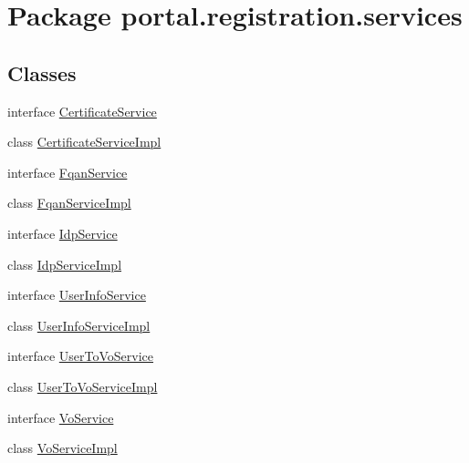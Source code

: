 \hypertarget{namespaceportal_1_1registration_1_1services}{
\section{Package portal.registration.services}
\label{namespaceportal_1_1registration_1_1services}
}
\subsection*{Classes}
\begin{DoxyCompactItemize}
\item 
interface \hyperlink{interfaceportal_1_1registration_1_1services_1_1CertificateService}{CertificateService}
\item 
class \hyperlink{classportal_1_1registration_1_1services_1_1CertificateServiceImpl}{CertificateServiceImpl}
\item 
interface \hyperlink{interfaceportal_1_1registration_1_1services_1_1FqanService}{FqanService}
\item 
class \hyperlink{classportal_1_1registration_1_1services_1_1FqanServiceImpl}{FqanServiceImpl}
\item 
interface \hyperlink{interfaceportal_1_1registration_1_1services_1_1IdpService}{IdpService}
\item 
class \hyperlink{classportal_1_1registration_1_1services_1_1IdpServiceImpl}{IdpServiceImpl}
\item 
interface \hyperlink{interfaceportal_1_1registration_1_1services_1_1UserInfoService}{UserInfoService}
\item 
class \hyperlink{classportal_1_1registration_1_1services_1_1UserInfoServiceImpl}{UserInfoServiceImpl}
\item 
interface \hyperlink{interfaceportal_1_1registration_1_1services_1_1UserToVoService}{UserToVoService}
\item 
class \hyperlink{classportal_1_1registration_1_1services_1_1UserToVoServiceImpl}{UserToVoServiceImpl}
\item 
interface \hyperlink{interfaceportal_1_1registration_1_1services_1_1VoService}{VoService}
\item 
class \hyperlink{classportal_1_1registration_1_1services_1_1VoServiceImpl}{VoServiceImpl}
\end{DoxyCompactItemize}
